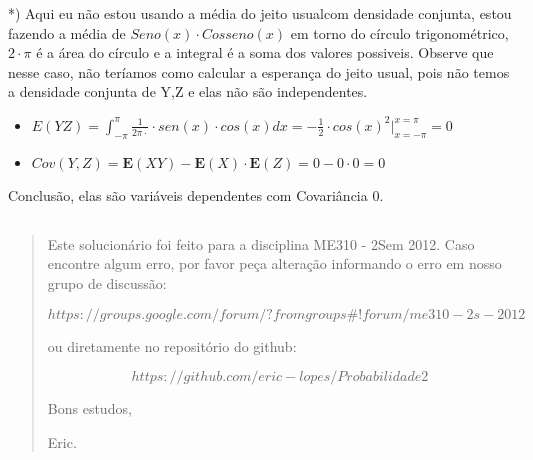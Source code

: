 \documentclass[english]{article}
\begin{document}
{*}) Aqui eu não estou usando a média do jeito usualcom densidade
conjunta, estou fazendo a média de $Seno(x)\cdot Cosseno(x)$ em torno
do círculo trigonométrico, $2\cdot\pi$ é a área do círculo e a integral
é a soma dos valores possiveis. Observe que nesse caso, não teríamos
como calcular a esperança do jeito usual, pois não temos a densidade
conjunta de Y,Z e elas não são independentes.
\begin{itemize}
\item $E(YZ)=\int_{-\pi}^{\pi}\frac{1}{2\pi\cdot}\cdot sen(x)\cdot cos(x)dx=-\frac{1}{2}\cdot cos(x)^{2}|_{x=-\pi}^{x=\pi}=0$
\item $Cov(Y,Z)=\mathbf{E}(XY)-\mathbf{E}(X)\cdot\mathbf{E}(Z)=0-0\cdot0=0$
\end{itemize}
Conclusão, elas são variáveis dependentes com Covariância 0.


\subsection*{\textcompwordmark{}}


\subsubsection*{\pagebreak{}}
\begin{quotation}
Este solucionário foi feito para a disciplina ME310 - 2Sem 2012. Caso
encontre algum erro, por favor peça alteração informando o erro em
nosso grupo de discussão: 

$$https://groups.google.com/forum/?fromgroups\#!forum/me310-2s-2012$$

ou diretamente no repositório do github:

$$https://github.com/eric-lopes/Probabilidade2$$

Bons estudos,

Eric.\end{quotation}
\end{document}
